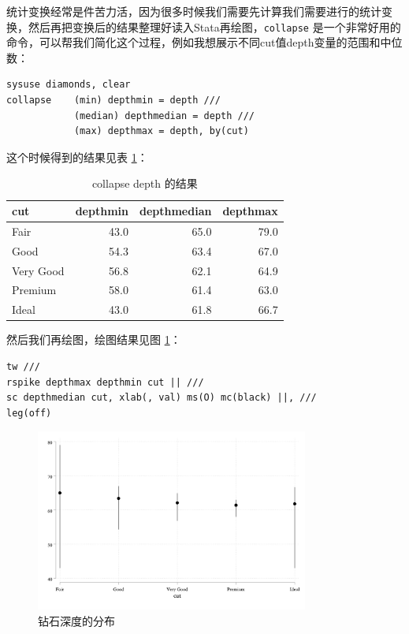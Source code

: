 \documentclass[]{ctexbook}
\begin{document}
统计变换经常是件苦力活，因为很多时候我们需要先计算我们需要进行的统计变换，然后再把变换后的结果整理好读入Stata再绘图，\texttt{collapse} 是一个非常好用的命令，可以帮我们简化这个过程，例如我想展示不同cut值depth变量的范围和中位数：

\begin{lstlisting}
sysuse diamonds, clear
collapse    (min) depthmin = depth ///
            (median) depthmedian = depth ///
            (max) depthmax = depth, by(cut)
\end{lstlisting}

这个时候得到的结果见表 \ref{tab:depthmmm}：

\begin{table}[t]

\caption{\label{tab:depthmmm}collapse depth 的结果}
\centering
\begin{tabular}{lrrr}
\toprule
cut & depthmin & depthmedian & depthmax\\
\midrule
Fair & 43.0 & 65.0 & 79.0\\
Good & 54.3 & 63.4 & 67.0\\
Very Good & 56.8 & 62.1 & 64.9\\
Premium & 58.0 & 61.4 & 63.0\\
Ideal & 43.0 & 61.8 & 66.7\\
\bottomrule
\end{tabular}
\end{table}

然后我们再绘图，绘图结果见图 \ref{fig:depth3m}：

\begin{lstlisting}
tw ///
rspike depthmax depthmin cut || ///
sc depthmedian cut, xlab(, val) ms(O) mc(black) ||, ///
leg(off)
\end{lstlisting}

\begin{figure}

{\centering \includegraphics[width=0.8\textwidth]{assets/depth3m} 

}

\caption{钻石深度的分布}\label{fig:depth3m}
\end{figure}
\end{document}
